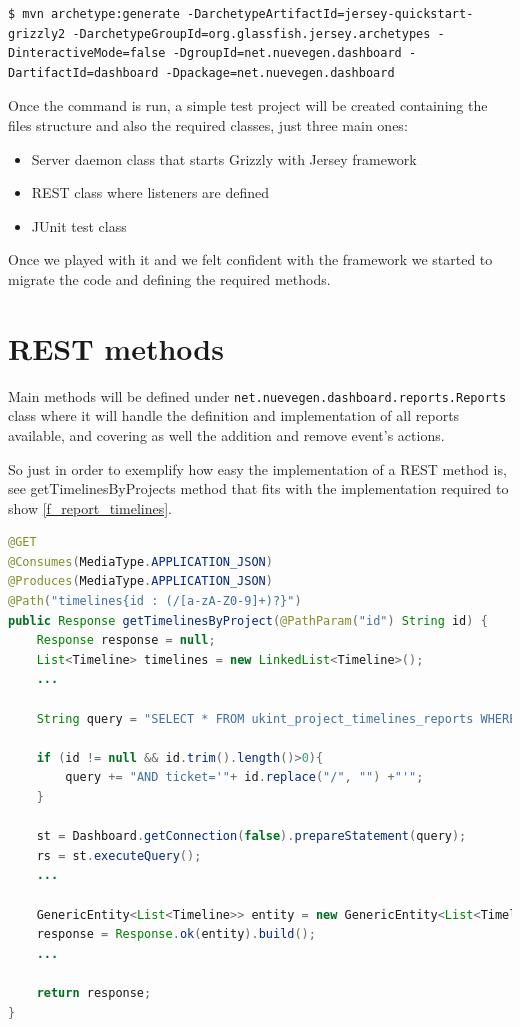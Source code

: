 \begin{lstlisting}[style=console,caption=Grizzly\ and\ Jersey\ First\ setup,label=f_setup_grizzlyjersey] 
$ mvn archetype:generate -DarchetypeArtifactId=jersey-quickstart-grizzly2 -DarchetypeGroupId=org.glassfish.jersey.archetypes -DinteractiveMode=false -DgroupId=net.nuevegen.dashboard -DartifactId=dashboard -Dpackage=net.nuevegen.dashboard 
\end{lstlisting}

Once the command is run, a simple test project will be created containing the
files structure and also the required classes, just three main ones: 
\begin{itemize}
  \item Server daemon class that starts Grizzly with Jersey framework
  \item REST class where listeners are defined
  \item JUnit test class
\end{itemize}

Once we played with it and we felt confident with the framework we started
to migrate the code and defining the required methods.

\section{REST methods}
Main methods will be defined under
\texttt{net.nuevegen.dashboard.reports.Reports} class where it will handle
the definition and implementation of all reports available, and covering as well
the addition and remove event's actions. 

So just in order to exemplify how easy the implementation of a REST method is,
see getTimelinesByProjects method that fits with the implementation required to
show \ref{f_report_timelines}.\\

\begin{lstlisting}[language=Java,breaklines=true,caption=Reports.getTimelinesByProjects(),label=f_migration_gettimelines]
@GET
@Consumes(MediaType.APPLICATION_JSON)
@Produces(MediaType.APPLICATION_JSON)
@Path("timelines{id : (/[a-zA-Z0-9]+)?}")
public Response getTimelinesByProject(@PathParam("id") String id) {
	Response response = null;
	List<Timeline> timelines = new LinkedList<Timeline>(); 
	...

	String query = "SELECT * FROM ukint_project_timelines_reports WHERE 1 ";

	if (id != null && id.trim().length()>0){
		query += "AND ticket='"+ id.replace("/", "") +"'";
	}
	
	st = Dashboard.getConnection(false).prepareStatement(query);
	rs = st.executeQuery();
	...
	
	GenericEntity<List<Timeline>> entity = new GenericEntity<List<Timeline>>(timelines) {};
	response = Response.ok(entity).build();
	...
	
	return response;
}
\end{lstlisting}

